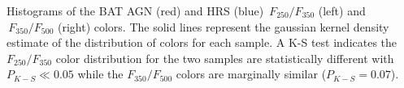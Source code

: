 \label{fig:hist_250_350_color} Histograms of the BAT AGN (red) and HRS (blue) $\,F_{250}/F_{350}$ (left) and  $\,F_{350}/F_{500}$ (right) colors. The solid lines represent the gaussian kernel density estimate of the distribution of colors for each sample. A K-S test indicates the $F_{250}/F_{350}$ color distribution for the two samples are statistically different with $P_{K-S} \ll 0.05$ while the $F_{350}/F_{500}$ colors are marginally similar ($P_{K-S} = 0.07$).